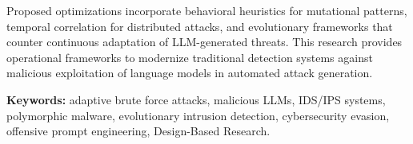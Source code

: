 Proposed optimizations incorporate behavioral heuristics for mutational patterns, temporal correlation for distributed attacks, and evolutionary frameworks that counter continuous adaptation of LLM-generated threats. This research provides operational frameworks to modernize traditional detection systems against malicious exploitation of language models in automated attack generation.

\textbf{Keywords:} adaptive brute force attacks, malicious LLMs, IDS/IPS systems, polymorphic malware, evolutionary intrusion detection, cybersecurity evasion, offensive prompt engineering, Design-Based Research.

\titlespacing*{\chapter}{0pt}{50pt}{40pt} 
\glsresetall
\clearpage